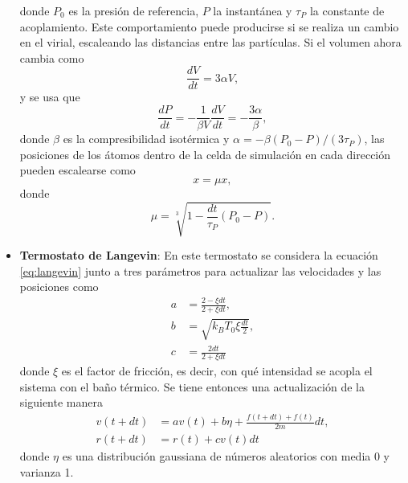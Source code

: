 \begin{itemize}
        donde $P_0$ es la presión de referencia, $P$ la instantánea y $\tau_P$ la 
        constante de acoplamiento. Este comportamiento puede producirse si se 
        realiza un cambio en el virial, escaleando las distancias entre las 
        partículas. Si el volumen ahora cambia como 
        \begin{equation}
            \frac{dV}{dt} = 3 \alpha V,
        \end{equation}
        y se usa que
        \begin{equation}
            \frac{dP}{dt} = - \frac{1}{\beta V} \frac{dV}{dt} = -\frac{3\alpha}{\beta},
        \end{equation}
        donde $\beta$ es la compresibilidad isotérmica y 
        $\alpha = - \beta (P_0 - P) / (3 \tau_P)$, las posiciones de los átomos 
        dentro de la celda de simulación en cada dirección pueden escalearse como
        \begin{equation}
            x = \mu x,
        \end{equation}
        donde
        \begin{equation}
        \mu = \sqrt[3]{1 - \frac{dt}{\tau_P} (P_0 - P)}.
        \end{equation}
    
    \item \textbf{Termostato de Langevin}:
        En este termostato se considera la ecuación \ref{eq:langevin} junto a 
        tres parámetros \cite{kroger2005} para actualizar las velocidades y 
        las posiciones como
        \begin{align}
            a &= \frac{2 - \xi dt}{2 + \xi dt}, \\
            b &= \sqrt{k_B T_0 \xi \frac{dt}{2}}, \\
            c &= \frac{2 dt}{2 + \xi dt}
        \end{align}
        donde $\xi$ es el factor de fricción, es decir, con qué intensidad se 
        acopla el sistema con el baño térmico. Se tiene entonces una 
        actualización de la siguiente manera
        \begin{align}
            v(t+dt) &= a v(t) + b \eta + \frac{f(t+dt)+f(t)}{2m} dt, \\
            r(t+dt) &= r(t) + c v(t) dt
        \end{align}
        donde $\eta$ es una distribución gaussiana de números aleatorios con 
        media 0 y varianza 1. 
    

\end{itemize}

